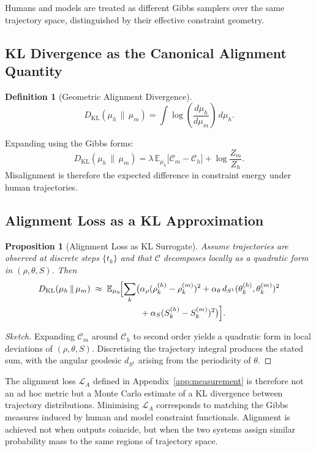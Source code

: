 \documentclass[12pt, a4paper]{article}
\newtheorem{definition}[theorem]{Definition}
\newtheorem{proposition}[theorem]{Proposition}
\theoremstyle{remark}
\theoremstyle{definition}
\begin{document}
Humans and models are treated as different Gibbs samplers over the same trajectory space,
distinguished by their effective constraint geometry.

\subsection{KL Divergence as the Canonical Alignment Quantity}

\begin{definition}[Geometric Alignment Divergence]
\[
D_{\mathrm{KL}}(\mu_h\,\|\,\mu_m)
= \int \log\!\left(\frac{d\mu_h}{d\mu_m}\right)\,d\mu_h.
\]
\end{definition}

Expanding using the Gibbs forms:
\[
D_{\mathrm{KL}}(\mu_h\,\|\,\mu_m)
= \lambda\,\mathbb{E}_{\mu_h}\bigl[\mathcal{C}_m - \mathcal{C}_h\bigr]
+ \log\frac{Z_m}{Z_h}.
\]
Misalignment is therefore the expected difference in constraint energy under human
trajectories.

\subsection{Alignment Loss as a KL Approximation}

\begin{proposition}[Alignment Loss as KL Surrogate]
\label{prop:klapprox}
Assume trajectories are observed at discrete steps $\{t_k\}$ and that $\mathcal{C}$
decomposes locally as a quadratic form in $(\rho, \theta, S)$.  Then
\begin{align*}
D_{\mathrm{KL}}(\mu_h\,\|\,\mu_m)
\;\approx\;
\mathbb{E}_{\mu_h}\!\Bigl[
\sum_k \bigl(
&\alpha_\rho(\rho_k^{(h)} - \rho_k^{(m)})^2
+ \alpha_\theta\,d_{S^1}(\theta_k^{(h)},\theta_k^{(m)})^2\\
&+ \alpha_S(S_k^{(h)} - S_k^{(m)})^2
\bigr)
\Bigr].
\end{align*}
\end{proposition}

\begin{proof}[Sketch]
Expanding $\mathcal{C}_m$ around $\mathcal{C}_h$ to second order yields a quadratic form
in local deviations of $(\rho, \theta, S)$.  Discretising the trajectory integral produces
the stated sum, with the angular geodesic $d_{S^1}$ arising from the periodicity of $\theta$.
\end{proof}

The alignment loss $\mathcal{L}_A$ defined in Appendix~\ref{app:measurement} is therefore
not an ad hoc metric but a Monte Carlo estimate of a KL divergence between trajectory
distributions.  Minimising $\mathcal{L}_A$ corresponds to matching the Gibbs measures
induced by human and model constraint functionals.  Alignment is achieved not when outputs
coincide, but when the two systems assign similar probability mass to the same regions of
trajectory space.
\end{document}
